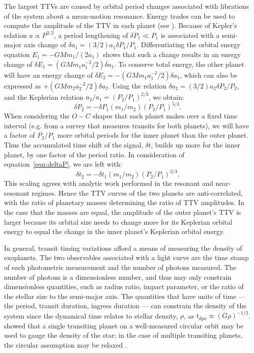 \documentclass[graybox,natbib,nosecnum]{svmult}
\begin{document}
The largest TTVs are caused by orbital period changes associated with librations of the system about a mean-motion resonance.  Energy trades can be used to compute the amplitude of the TTV in each planet (see \citealt{2005MNRAS.359..567A,2010Sci...330...51H}).  Because of Kepler's relation $a \propto P^{3/2}$, a period lengthening of $\delta P_1 \ll P_1$ is associated with a semi-major axis change of $\delta a_1 = (3/2) a_1 \delta P_1 / P_1$.  Differentiating the orbital energy equation $E_1=-G M m_1 /(2a_1)$ shows that such a change results in an energy change of $\delta E_1=(GMm_1 a_1^{-2}/2) \delta a_1$.  To conserve total energy, the other planet will have an energy change of $\delta E_2=-(GMm_1 a_1^{-2}/2) \delta a_1$, which can also be expressed as $+(GMm_2 a_2^{-2}/2)\delta a_2$.  Using the relation $\delta a_2 = (3/2) a_2 \delta P_2 / P_2$, and the Keplerian relation $a_2/a_1=(P_2/P_1)^{2/3}$, we obtain: 
\begin{equation}
\delta P_2 = -\delta P_1 (m_1/m_2) (P_2/P_1)^{5/3}. \label{eqn:deltaP}
\end{equation}
When considering the $O-C$ shapes that each planet makes over a fixed time interval (e.g. from a survey that measures transits for both planets), we will have a factor of $P_2/P_1$ more orbital periods for the inner planet than the outer planet.  Thus the accumulated time shift of the signal, $\delta t$, builds up more for the inner planet, by one factor of the period ratio. In consideration of equation~\ref{eqn:deltaP}, we are left with: 
\begin{equation}
\delta t_2 = -\delta t_1 (m_1/m_2) (P_2/P_1)^{2/3}. \label{eqn:deltat}
\end{equation}
This scaling agrees with analytic work performed in the resonant \citep{2016ApJ...823...72N} and near-resonant \citep{2012ApJ...761..122L,2016ApJ...828...44H} regimes. Hence the TTV curves of the two planets are anti-correlated, with the ratio of planetary masses determining the ratio of TTV amplitudes. In the case that the masses are equal, the amplitude of the outer planet's TTV is larger because its orbital size needs to change more for its Keplerian orbital energy to equal the change in the inner planet's Keplerian orbital energy. 

In general, transit timing variations afford a means of measuring the density of exoplanets.
The two observables associated with a light curve are the time stamp of each photometric
measurement and the number of photons measured.  The number of photons is a dimensionless
number, and thus may only constrain dimensionless quantities, such as radius ratio, impact 
parameter, or the ratio of the stellar size to the semi-major axis.  The quantities that 
have units of time --- the period, transit duration, ingress duration ---  can 
constrain the density of the system since the dynamical time relates to stellar density, $\rho$, as
$t_{dyn} \approx (G\rho)^{-1/2}$.  \citet{2003ApJ...585.1038S} showed that a single transiting planet
on a well-measured circular orbit may be used to gauge the density of the star;
in the case of multiple transiting planets, the circular assumption may be relaxed
\citep{2014MNRAS.440.2164K}.
\end{document}
